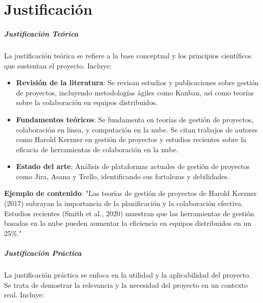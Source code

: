 \chapter{Justificación}
\label{Justificación}


\paragraph{Justificación Teórica}
La justificación teórica se refiere a la base conceptual y los principios científicos que sustentan el proyecto. Incluye: 

\begin{itemize}
    \item \textbf{Revisión de la literatura}: Se revisan estudios y publicaciones sobre gestión de proyectos, incluyendo metodologías ágiles como  Kanban, así como teorías sobre la colaboración en equipos distribuidos.
    \item \textbf{Fundamentos teóricos}: Se fundamenta en teorías de gestión de proyectos, colaboración en línea, y computación en la nube. Se citan trabajos de autores como Harold Kerzner en gestión de proyectos y estudios recientes sobre la eficacia de herramientas de colaboración en la nube.
    \item \textbf{Estado del arte}: Análisis de plataformas actuales de gestión de proyectos como Jira, Asana y Trello, identificando sus fortalezas y debilidades.
\end{itemize}
\textbf{Ejemplo de contenido}: "Las teorías de gestión de proyectos de Harold Kerzner (2017) subrayan la importancia de la planificación y la colaboración efectiva. Estudios recientes (Smith et al., 2020) muestran que las herramientas de gestión basadas en la nube pueden aumentar la eficiencia en equipos distribuidos en un 25\%."

\paragraph{Justificación Práctica}
La justificación práctica se enfoca en la utilidad y la aplicabilidad del proyecto. Se trata de demostrar la relevancia y la necesidad del proyecto en un contexto real. Incluye: 

